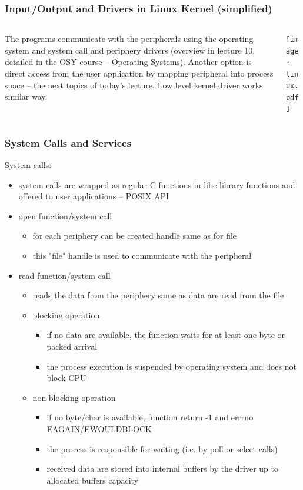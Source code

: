 \documentclass{beamer}
\begin{document}
\begin{frame}
\frametitle{Input/Output and Drivers in Linux Kernel (simplified)}
\begin{columns}
\begin{column}{0.4\textwidth}
The programs communicate with the peripherals using the operating system and system call and periphery drivers (overview in lecture 10, detailed in the OSY course -- Operating Systems).
\bigskip
Another option is direct access from the user application by mapping peripheral into process space -- the next topics of today's lecture. Low level kernel driver works similar way.
\end{column}
\begin{column}{0.58\textwidth}
\texttt{[image: linux.pdf]}
\end{column}
\end{columns}
\end{frame}


\begin{frame}
\frametitle{System Calls and Services}

System calls:
\begin{itemize}
\item system calls are wrapped as regular C functions in libc library functions and offered to user applications -- POSIX API
\item open function/system call
    \begin{itemize}
    \item for each periphery can be created handle same as for file
    \item this "file" handle is used to communicate with the peripheral
    \end{itemize}
\item read function/system call
    \begin{itemize}
    \item reads the data from the periphery same as data are read from the file
    \item blocking operation
        \begin{itemize}
        \item if no data are available, the function waits for at least one byte or packed arrival
        \item the process execution is suspended by operating system and does not block CPU
        \end{itemize}
    \item non-blocking operation
        \begin{itemize}
        \item if no byte/char is available, function return -1 and errrno EAGAIN/EWOULDBLOCK
        \item the process is responsible for waiting (i.e. by poll or select calls)
        \item received data are stored into internal buffers by the driver up to allocated buffers capacity
        \end{itemize}
    \end{itemize}
\end{itemize}
\end{frame}
\end{document}
